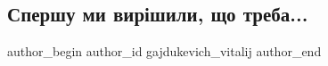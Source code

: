  
 
 
 
 
 
\subsection{Спершу ми вирішили, що треба...}
\label{sec:17_04_2022.fb.gajdukevich_vitalij.1.spershu_my_vyrishyly}
 
\ifcmt
 author_begin
   author_id gajdukevich_vitalij
 author_end
\fi
